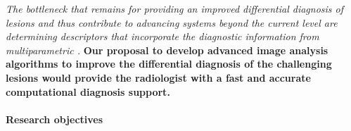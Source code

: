 




\emph{The bottleneck that remains for providing an improved differential
diagnosis of \nmle lesions and thus contribute to advancing
\cad systems beyond the current level are determining descriptors that
incorporate the diagnostic information from multiparametric \mri.}
\textbf{Our proposal to develop advanced image analysis algorithms to improve
the differential diagnosis of the challenging \nmle lesions
would provide the radiologist with a fast and accurate computational diagnosis
support.}


\paragraph{Research objectives}

